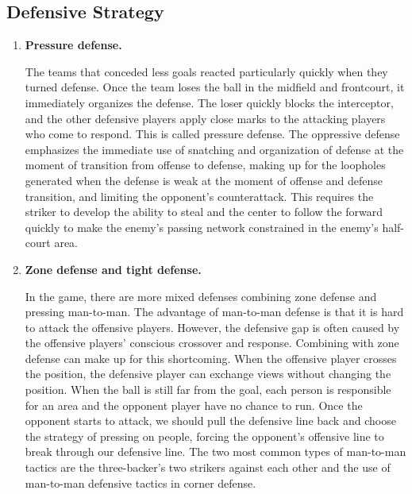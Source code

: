 \documentclass{mcmthesis}
\begin{document}
\begin{enumerate}[(1)]
\end{enumerate}
\subsection{Defensive Strategy}
\begin{enumerate}[(1)]
	\item \textbf{Pressure defense.}\par
	\qquad The teams that conceded less goals reacted particularly quickly when they turned defense. Once the team loses the ball in the midfield and frontcourt, it immediately organizes the defense. The loser quickly blocks the interceptor, and the other defensive players apply close marks to the attacking players who come to respond. This is called pressure defense. The oppressive defense emphasizes the immediate use of snatching and organization of defense at the moment of transition from offense to defense, making up for the loopholes generated when the defense is weak at the moment of offense and defense transition, and limiting the opponent's counterattack. This requires the striker to develop the ability to steal and the center to follow the forward quickly to make the enemy's passing network constrained in the enemy's half-court area.
	\item \textbf{Zone defense and tight defense.}\par
	\qquad In the game, there are more mixed defenses combining zone defense and pressing man-to-man. The advantage of man-to-man defense is that it is hard to attack the offensive players. However, the defensive gap is often caused by the offensive players' conscious crossover and response. Combining with zone defense can make up for this shortcoming. When the offensive player crosses the position, the defensive player can exchange views without changing the position. When the ball is still far from the goal, each person is responsible for an area and the opponent player have no chance to run. Once the opponent starts to attack, we should pull the defensive line back and choose the strategy of pressing on people, forcing the opponent's offensive line to break through our defensive line. The two most common types of man-to-man tactics are the three-backer's two strikers against each other and the use of man-to-man defensive tactics in corner defense.
\end{enumerate}
\end{document}
